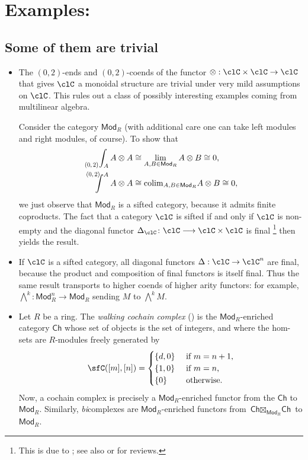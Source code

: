 \documentclass[11pt]{amsart}
\begin{document}
\section{Examples:}
\label{sec:orgb57aafa}
\subsection{Some of them are trivial}
\begin{example}\leavevmode
	\begin{itemize} 
		\item The $(0,2)$-ends and $(0,2)$-coends of the functor $\otimes : \clC \times \clC \to \clC$ that gives $\clC$ a monoidal structure are trivial under very mild assumptions on $\clC$. This rules out a class of possibly interesting examples coming from multilinear algebra.

	Consider the category $\mathsf{Mod}_R$ (with additional care one can take left modules and right modules, of course). To show that
	\begin{align*}
		\pqEnd{0}{2}{A}{A\otimes A}   & \cong \lim_{A,B\in\mathsf{Mod}_R} A\otimes B    \cong 0, \\
		\pqCoend{0}{2}{A}{A\otimes A} & \cong \colim_{A,B\in\mathsf{Mod}_R} A\otimes B  \cong 0,
	\end{align*}
	we just observe that $\mathsf{Mod}_R$ is a sifted category, because it admits finite coproducts. The fact that a category $\clC$ is sifted if and only if $\clC$ is non-empty and the diagonal functor $\Delta_{\clC}\colon\clC\longrightarrow\clC\times\clC$ is final%
	\footnote{%
		This is due to \cite{gabriel-ulmer}; see also \cite[Proposition 5.3.2]{richter2020categories} or \cite[Theorem 2.15]{algebraic-theories-arv} for reviews.
	} %
	then yields the result.

	\item If $\clC$ is a sifted category, all diagonal functors $\Delta : \clC \to \clC^n$ are final, because the product and composition of final functors is itself final. Thus the same result transports to higher coends of higher arity functors: for example, $\bigwedge^{k} : \mathsf{Mod}_R^{n} \to \mathsf{Mod}_R$ sending $M$ to $\bigwedge^{k}M$.
	\item Let $R$ be a ring. The \emph{walking cochain complex} (\cite[Paragraph 35.1]{joyal:quasi}) is the $\mathsf{Mod}_{R}$-enriched category $\textsf{Ch}$ whose set of objects is the set of integers, and where the hom-sets are $R$-modules freely generated by
	\[
		\sfC([m],[n])=\begin{cases}
			\{d,0\} & \text{ if } m=n+1\text{,} \\
			\{1,0\}   & \text{ if } m=n\text{,}   \\
			\{0\}     & \text{ otherwise.}
		\end{cases}
	\]
	Now, a cochain complex is precisely a $\mathsf{Mod}_{R}$-enriched functor from the $\textsf{Ch}$ to $\mathsf{Mod}_{R}$. Similarly, \emph{bi}complexes are $\mathsf{Mod}_{R}$-enriched functors from $\textsf{Ch}\boxtimes_{\mathsf{Mod}_{R}}\textsf{Ch}$ to $\mathsf{Mod}_{R}$.


\end{itemize}
\end{example}
\end{document}
